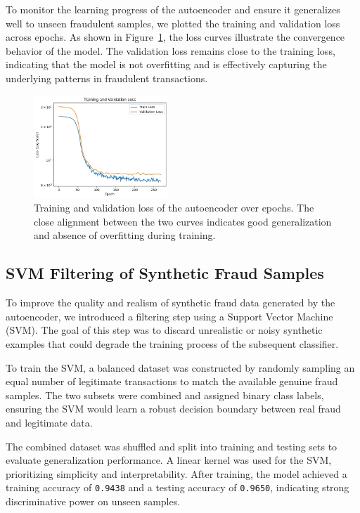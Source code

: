 To monitor the learning progress of the autoencoder and ensure it generalizes well to unseen fraudulent samples, we plotted the training and validation loss across epochs. As shown in Figure~\ref{fig:autoencoder-loss}, the loss curves illustrate the convergence behavior of the model. The validation loss remains close to the training loss, indicating that the model is not overfitting and is effectively capturing the underlying patterns in fraudulent transactions.

\begin{figure}[h]
    \centering
    \includegraphics[width=0.45\textwidth]{images/autoencoder_loss.jpg}
    \caption{Training and validation loss of the autoencoder over epochs. The close alignment between the two curves indicates good generalization and absence of overfitting during training.}
    \label{fig:autoencoder-loss}
\end{figure}

\subsection{SVM Filtering of Synthetic Fraud Samples}
To improve the quality and realism of synthetic fraud data generated by the autoencoder, we introduced a filtering step using a Support Vector Machine (SVM). The goal of this step was to discard unrealistic or noisy synthetic examples that could degrade the training process of the subsequent classifier.

To train the SVM, a balanced dataset was constructed by randomly sampling an equal number of legitimate transactions to match the available genuine fraud samples. The two subsets were combined and assigned binary class labels, ensuring the SVM would learn a robust decision boundary between real fraud and legitimate data.

The combined dataset was shuffled and split into training and testing sets to evaluate generalization performance. A linear kernel was used for the SVM, prioritizing simplicity and interpretability. After training, the model achieved a training accuracy of \texttt{0.9438} and a testing accuracy of \texttt{0.9650}, indicating strong discriminative power on unseen samples.

